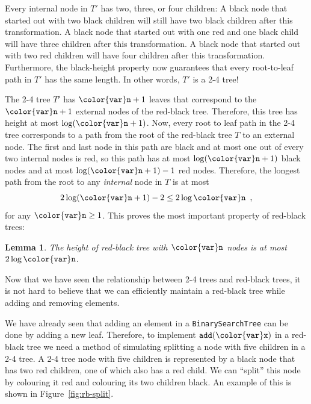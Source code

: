\documentclass[10pt]{book}
\newcommand{\figref}[1]{Figure~\ref{fig:#1}}
\theoremstyle{plain}
\newtheorem{lem}{Lemma}[chapter]
\theoremstyle{definition}
\begin{document}
Every internal node in $T'$ has two, three, or four children: A black
node that started out with two black children will still have two
black children after this transformation.  A black node that started
out with one red and one black child will have three children after this
transformation.  A black node that started out with two red children will
have four children after this transformation.  Furthermore, the black-height
property now guarantees that every root-to-leaf path in $T'$ has the
same length.  In other words, $T'$ is a 2-4 tree!

The 2-4 tree $T'$ has $\ensuremath{\mathtt{{\color{var}n}}}+1$ leaves that correspond to the $\ensuremath{\mathtt{{\color{var}n}}}+1$
external nodes of the red-black tree.  Therefore, this tree has height
at most $\log (\ensuremath{\mathtt{{\color{var}n}}}+1)$. Now, every root to leaf path in the 2-4 tree corresponds
to a path from the root of the red-black tree $T$ to an external node.
The first and last node in this path are black and at most one out of
every two internal nodes is red, so this path has at most $\log(\ensuremath{\mathtt{{\color{var}n}}}+1)$
black nodes and at most $\log(\ensuremath{\mathtt{{\color{var}n}}}+1)-1$ red nodes.  Therefore, the longest path from the root to any \emph{internal} node in $T$ is at most
\[
   2\log(\ensuremath{\mathtt{{\color{var}n}}}+1) -2 \le 2\log \ensuremath{\mathtt{{\color{var}n}}} \enspace ,
\]
for any $\ensuremath{\mathtt{{\color{var}n}}}\ge 1$.  This proves the most important property of
red-black trees:
\begin{lem}
The height of red-black tree with \ensuremath{\mathtt{{\color{var}n}}} nodes is at most $2\log \ensuremath{\mathtt{{\color{var}n}}}$.
\end{lem}

Now that we have seen the relationship between 2-4 trees and
red-black trees, it is not hard to believe that we can efficiently
maintain a red-black tree while adding and removing elements.  

We have already seen that adding an element in a \texttt{BinarySearchTree}
can be done by adding a new leaf.  Therefore, to implement \ensuremath{\mathtt{add({\color{var}x})}} in a
red-black tree we need a method of simulating splitting a node with five
children in a 2-4 tree.  A 2-4 tree node with five children is represented
by a black node that has two red children, one of which also has a red
child. We can ``split'' this node by colouring it red and colouring its
two children black.  An example of this is shown in \figref{rb-split}.
\end{document}
